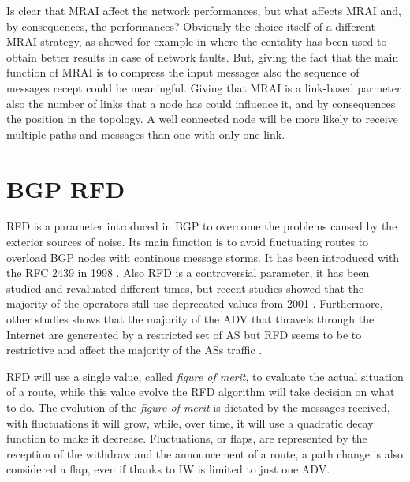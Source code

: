Is clear that \ac{MRAI} affect the network performances, but what affects \ac{MRAI}
and, by consequences, the performances?
Obviously the choice itself of a different \ac{MRAI} strategy, as showed for 
example in \cite{milani2019BGP} where the centality has been used to obtain better
results in case of network faults.
But, giving the fact that the main function of \ac{MRAI} is to compress the 
input messages also the sequence of messages recept could be meaningful.
Giving that \ac{MRAI} is a link-based parmeter also the number of links that
a node has could influence it, and by consequences the position in the topology.
A well connected node will be more likely to receive multiple paths and messages
than one with only one link.


\section{BGP RFD}
\label{sec:bgp_rfd}

\ac{RFD} is a parameter introduced in \ac{BGP} to overcome the problems caused
by the exterior sources of noise.
Its main function is to avoid fluctuating routes to overload \ac{BGP} nodes 
with continous message storms.
It has been introduced with the \ac{RFC} \num{2439} in \num{1998} \cite{rfc2439}.
Also \ac{RFD} is a controversial parameter, it has been studied and revaluated
different times, but recent studies showed that the majority of the operators 
still use deprecated values from \num{2001} \cite{gray2020bgp}.
Furthermore, other studies shows that the majority of the \ac{ADV} that thravels
through the Internet are genereated by a restricted set of \ac{AS} but \ac{RFD}
seems to be to restrictive and affect the majority of the \acp{AS} traffic
\cite{pelsser2011route}.

\ac{RFD} will use a single value, called \textit{figure of merit}, to evaluate
the actual situation of a route, while this value evolve the \ac{RFD} algorithm
will take decision on what to do.
The evolution of the \textit{figure of merit} is dictated by the messages received,
with fluctuations it will grow, while, over time, it will use a quadratic decay
function to make it decrease.
Fluctuations, or flaps, are represented by the reception of the withdraw and
the announcement of a route, a path change is also considered a flap, even
if thanks to \ac{IW} is limited to just one \ac{ADV}.

